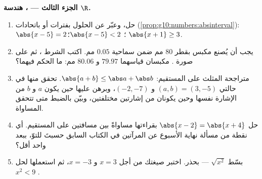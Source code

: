 \begin{problem}
\medskip
\noindent\textbf{الجزء الثالث --- ، هندسة
$\R$.}
\begin{enumerate}[resume]
  \item حل، وعبّر عن الحلول بفترات أو باتحادات
        (\cref{prop:g10:numbers:absinterval}):
        $\abs{x - 5} = 2$؛ \quad $\abs{x - 5} < 2$؛ \quad
        $\abs{x + 1} \geq 3$.
  \item يجب أن يُصنع مكبس بقطر $80$ مم ضمن
        سماحية $0.05$ مم. اكتب الشرط ، ثم على صورة . مكبسان قياسهما
        $79.97$ و $80.06$ مم: ما الحكم فيهما؟
  \item متراجحة المثلث على المستقيم:
        $\abs{a + b} \leq \abs a + \abs b$. تحقق منها في حالتي
        $(a, b) = (3, -5)$ و $(-2, -7)$، وبرهن عليها حين يكون $a$ و
        $b$ من الإشارة نفسها وحين يكونان من إشارتين
        مختلفتين، وبيّن بالضبط متى تتحقق المساواة.
  \item حل $\abs{x - 2} = \abs{x + 4}$ بقراءتها مساواةً بين
        مسافتين على المستقيم. أي نقطة من
        مسألة نهاية الأسبوع عن المرآتين في الكتاب السابق حسبتَ للتوّ، ببعد
        واحد أقل؟
  \item بسّط $\sqrt{x^2}$ --- بحذر. اختبر صيغتك
        من أجل $x = 3$ و $x = -3$، ثم استعملها لحل
        $x^2 < 9$ .
\end{enumerate}


\end{problem}
